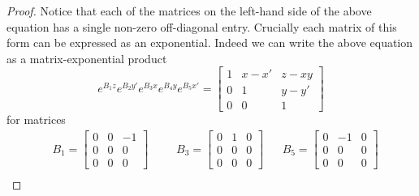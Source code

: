 \begin{proof}
Notice that each of the matrices on the left-hand side of the above
equation has a single non-zero off-diagonal entry.  Crucially each
matrix of this form can be expressed as an exponential.  Indeed we can
write the above equation as a matrix-exponential product
\[ e^{B_1z} e^{B_2y'} e^{B_3x} e^{B_4y} e^{B_5x'} = \begin{bmatrix}1&x-x'&z-xy\\0&1&y-y'\\0&0&1\end{bmatrix} \]
for matrices
\begin{align*}
&B_1=\begin{bmatrix}0&0&-1\\0&0&0\\0&0&0\end{bmatrix} &&
&B_3=\begin{bmatrix}0&1&0\\0&0&0\\0&0&0\end{bmatrix} &&
B_5=\begin{bmatrix}0&-1&0\\0&0&0\\0&0&0\end{bmatrix} \\[10pt]

\end{align*}
\end{proof}
